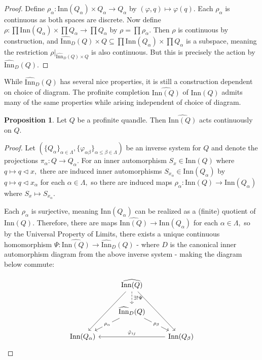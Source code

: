 \documentclass[reqno,dvipsnames]{amsart}
\renewcommand{\a}{\alpha}
\renewcommand{\b}{\beta}
\newcommand{\Inn}{\text{Inn}}
\newcommand{\pInn}{\widehat{\text{Inn}}}
\theoremstyle{definition}
\newtheorem{proposition}[theorem]{Proposition}
\begin{document}
{\begin{proof}
Define $\rho_\a : \Inn(Q_\a) \times Q_\a \to Q_\a$ by $(\varphi, q) \mapsto \varphi(q).$ Each $\rho_\a$ is continuous as both spaces are discrete. Now define $\rho: \prod \Inn(Q_\a) \times \prod Q_\a \to \prod Q_\a$ by $\rho = \prod \rho_\a.$ Then $\rho$ is continuous by construction, and $\pInn_D(Q) \times Q \subseteq \prod \Inn(Q_\a) \times \prod Q_\a$ is a subspace, meaning the restriction $\rho|_{\pInn_D(Q) \times Q}$ is also continuous. But this is precisely the action by $\pInn_D(Q). $  
\end{proof}

While $\pInn_D(Q)$ has several nice properties, it is still a construction dependent on choice of diagram. The profinite completion $\widehat{\Inn(Q)}$ of $\Inn(Q)$ admits many of the same properties while arising independent of choice of diagram.

\begin{proposition}
Let $Q$ be a profinite quandle. Then $\widehat{\Inn(Q)}$ acts continuously on $Q.$
\end{proposition}

\begin{proof}
Let $(\{Q_\a\}_{\a \in \Lambda},\{\varphi_{\a\b}\}_{\a \leq \b \in \Lambda})$ be an inverse system for $Q$ and denote the projections $\pi_\a : Q \to Q_\a$. For an inner automorphism $S_x \in \Inn(Q)$ where $q \mapsto q \triangleleft x,$ there are induced inner automorphisms $S_{x_\a} \in \Inn(Q_\a)$ by $q \mapsto q \triangleleft x_\a$ for each $\a \in \Lambda,$ so there are induced maps $\rho_\a : \Inn(Q) \to \Inn(Q_\a)$ where $S_x \mapsto S_{x_\a}.$

Each $\rho_\a$ is surjective, meaning $\Inn(Q_\a)$ can be realized as a (finite) quotient of $\Inn(Q).$ Therefore, there are maps $\widehat{\Inn(Q)} \to \Inn(Q_\a)$ for each $\alpha \in \Lambda,$ so by the Universal Property of Limits, there exists a unique continuous homomorphism $\Psi : \widehat{\Inn(Q)} \to \pInn_D(Q)$ - where $D$ is the canonical inner automorphism diagram from the above inverse system - making the diagram below commute:

\[\begin{tikzcd}
	& {\widehat{\Inn(Q)}} \\
	& {\pInn_D(Q)} \\
	{\Inn(Q_\a)} && {\Inn(Q_\b)}
	\arrow["{\rho_\b}"{description}, from=2-2, to=3-3]
	\arrow["{\rho_\a}"{description}, from=2-2, to=3-1]
	\arrow["{\hat\varphi_{ij}}"', from=3-3, to=3-1]
	\arrow["{}", from=1-2, to=3-3]
	\arrow["{}"', from=1-2, to=3-1]
	\arrow["{\exists!\Psi}", dashed, from=1-2, to=2-2]
\end{tikzcd}\]



\end{proof}}
\end{document}
